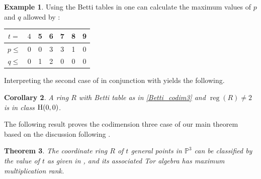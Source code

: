 \documentclass[reqno]{amsart}
\DeclareMathOperator{\reg}{reg}
\renewcommand{\P}{\mathbb{P}}
\theoremstyle{plain} %
\newtheorem{theorem}{Theorem}[section] %
\newtheorem{corollary}[theorem]{Corollary}
\theoremstyle{definition}
\newtheorem{example}[theorem]{Example}
\theoremstyle{remark}
\begin{document}
 \begin{example}\label{ex: pq values}
Using the Betti tables in  one can calculate the maximum values of $p$ and $q$ allowed by :

\begin{center}
\begin{tabular}{c|c c c c c c}
        $t=$& $4$&5&6&7&8&9\\
    \hline
     $ p \leq$& 0&0&3&3&1&0  \\
     $ q \leq$& 0&1&2&0&0&0
\end{tabular}
\end{center}
\end{example}

Interpreting the second case of 
 in conjunction with   yields the following.

\begin{corollary}\label{reg 2}
A ring $R$ with Betti table as in \eqref{Betti_codim3} and $\reg(R)\neq2$ is in class $\rm H(0,0)$. 
\end{corollary}


The following result proves the codimension three case of our main theorem based on the discussion following .



\begin{theorem}\label{ClassThmForJ}
   The coordinate ring $R$ of $t$ general points in $\P^3$  can be classified by the value of $t$ as given in , and its associated Tor algebra has maximum multiplication rank. 
\end{theorem}
\end{document}
